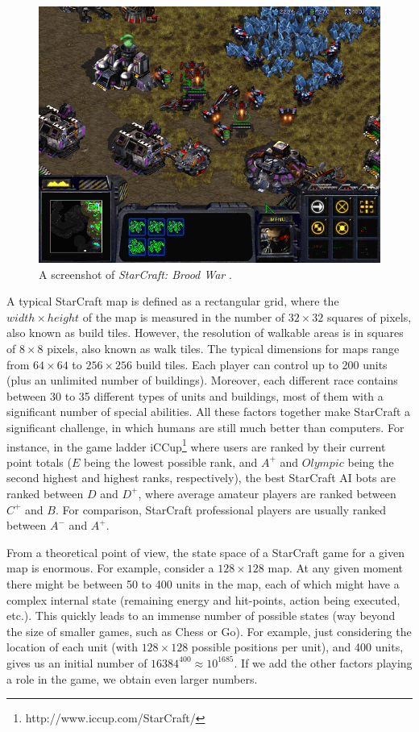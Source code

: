 \documentclass[journal]{IEEEtran}
\begin{document}
\begin{figure}
    \centering
    \includegraphics[width=0.8\columnwidth]{figures/starcraft1.png}
    \caption{A screenshot of \emph{StarCraft: Brood War}%
    .}
    \label{fig:StarCraft}
\end{figure}

A typical StarCraft map is defined as a rectangular grid, where the $width \times height$ of the map is measured in the number of $32 \times 32$ squares of pixels, also known as build tiles. However, the
resolution of walkable areas is in squares of $8 \times 8$ pixels, also known as walk tiles. The typical dimensions for maps range from $64 \times 64$ to $256 \times 256$ build tiles. Each player  can
control up  to 200 units (plus an unlimited number of buildings).  Moreover, each
different race  contains between 30  to 35 different types  of units
and  buildings,  most of them with  a significant  number  of  special
abilities. All these factors  together make StarCraft a significant
challenge,   in   which   humans    are   still   much   better   than
computers. For instance, in the game ladder iCCup\footnote{http://www.iccup.com/StarCraft/} where users are ranked by their current point totals ($E$ being the lowest possible rank, and $A^+$ and $Olympic$ being the second highest and highest ranks, respectively), the best StarCraft AI bots are ranked between $D$ and $D^+$, where average  amateur players are  ranked between $C^+$ and  $B$. For comparison, StarCraft professional  players are usually ranked between
$A^-$ and $A^+$.

From a theoretical point of view, the state space of a StarCraft game for a given map is enormous. For example, consider a $128 \times 128$ map. At any given moment there might be between 50 to 400 units in the map, each of which might have a complex internal state (remaining energy and hit-points, action being executed, etc.). This quickly leads to an immense number of possible states (way beyond the size of smaller games, such as Chess or Go). For example, just considering the location of each unit (with $128 \times 128$ possible positions per unit), and 400 units, gives us an initial number of $16384^{400} \approx 10^{1685}$. If we add the other factors playing a role in the game, we obtain even larger numbers. 
\end{document}
